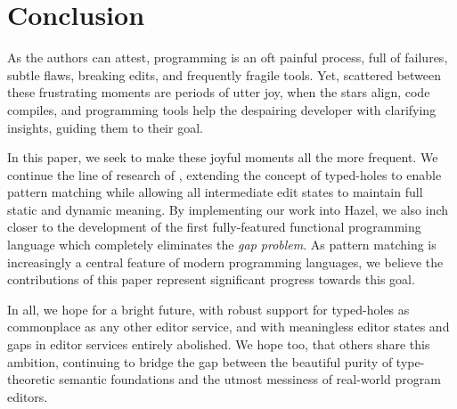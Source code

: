 \section{Conclusion}\label{sec:conclusion}
As the authors can attest, programming is an oft painful process, full of failures, subtle flaws, breaking edits, and frequently fragile tools. Yet, scattered between these frustrating moments are periods of utter joy, when the stars align, code compiles, and programming tools help the despairing developer with clarifying insights, guiding them to their goal. 

In this paper, we seek to make these joyful moments all the more frequent. We continue the line of research of \cite{DBLP:conf/popl/OmarVHAH17,DBLP:conf/snapl/OmarVHSGAH17}, extending the concept of typed-holes to enable pattern matching while allowing all intermediate edit states to maintain full static and dynamic meaning. By implementing our work into Hazel, we also inch closer to the development of the first fully-featured functional programming language which completely eliminates the \emph{gap problem}. As pattern matching is increasingly a central feature of modern programming languages, we believe the contributions of this paper represent significant progress towards this goal.

In all, we hope for a bright future, with robust support for typed-holes as commonplace as any other editor service, and with meaningless editor states and gaps in editor services entirely abolished. We hope too, that others share this ambition, continuing to bridge the gap between the beautiful purity of type-theoretic semantic foundations and the utmost messiness of real-world program editors. 